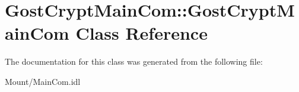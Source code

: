 \hypertarget{class_gost_crypt_main_com_1_1_gost_crypt_main_com}{}\section{Gost\+Crypt\+Main\+Com\+:\+:Gost\+Crypt\+Main\+Com Class Reference}
\label{class_gost_crypt_main_com_1_1_gost_crypt_main_com}


The documentation for this class was generated from the following file\+:\begin{DoxyCompactItemize}
\item 
Mount/Main\+Com.\+idl\end{DoxyCompactItemize}
